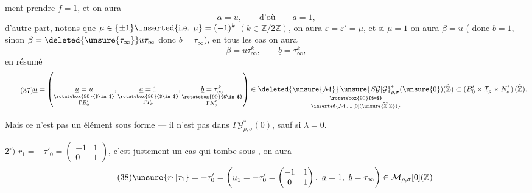 ment prendre $f=1$, et on aura
\[
\alpha=\underline u,\qquad\text{d'où}\qquad\underline a=1,
\]
d'autre part, notons que $\mu\in\{\pm1\}\inserted{\text{i.e. }\mu}=(-1)^k$ $(k\in\mathbb Z/2\mathbb Z)$, on aura $\varepsilon=\varepsilon'=\mu$, et si $\mu=1$  on aura $\beta=\underline u$ ( donc $\underline b=1$, sinon $\beta=\deleted{\unsure{\tau_\infty}}u\tau_\infty$ donc $\underline b=\tau_\infty$), en tous les cas on aura
\[
\beta=u\tau_\infty^k,\qquad\underline b=\tau_\infty^k,
\]
en résumé
\[
\tag{37}
\begin{gathered}
\underline u=\left(
\underset{\substack{\rotatebox{90}{$\in$}\\\Gamma B'_0}}{\underline u=u},
\underset{\substack{\rotatebox{90}{$\in$}\\\Gamma T_\rho}}{\underline a=1},
\underset{\substack{\rotatebox{90}{$\in$}\\\Gamma N'_\sigma}}{\underline b=\tau_\infty^k}
\right)
\in
\underset{\substack{\rotatebox{90}{$=$}\\\inserted{\mathcal M_{\rho,\sigma}[0](\unsure{\widehat{\mathbb Z}|\mathbb Z})}}}
{\deleted{\unsure{\mathcal M}}\,\unsure{S\mathcal G|\mathcal G}_{\rho,\sigma}^{*}(\unsure{0})(\widehat{\mathbb Z})}
\subset\left(B'_0\times T_\rho\times N'_\sigma\right)(\widehat{\mathbb Z}).
\end{gathered}
\]


Mais ce n'est pas un élément sous forme   ---   il n'est pas dans $\Gamma\mathcal G_{\rho,\sigma}^{*}(0)$, sauf si $\lambda=0$. 

$2^\circ)$ $r_1=-\tau'_0=\begin{pmatrix}-1&1\\0&1\end{pmatrix}$, c'est justement un cas qui tombe sous , on aura
\[
\tag{38}
\unsure{r_1|\tau_1}=-\tau'_0=
\left(\underline u_1=-\tau'_0=\begin{pmatrix}-1&1\\0&1\end{pmatrix},\ \underline a=1,\ \underline b=\tau_\infty\right)
\in\mathcal M_{\rho,\sigma}[0](\mathbb Z)
\]

